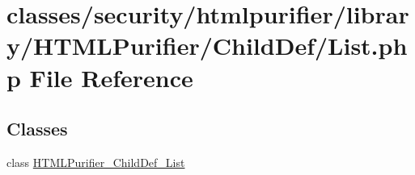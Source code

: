 \hypertarget{ChildDef_2List_8php}{\section{classes/security/htmlpurifier/library/\+H\+T\+M\+L\+Purifier/\+Child\+Def/\+List.php File Reference}
\label{ChildDef_2List_8php}
}
\subsection*{Classes}
\begin{DoxyCompactItemize}
\item 
class \hyperlink{classHTMLPurifier__ChildDef__List}{H\+T\+M\+L\+Purifier\+\_\+\+Child\+Def\+\_\+\+List}
\end{DoxyCompactItemize}
